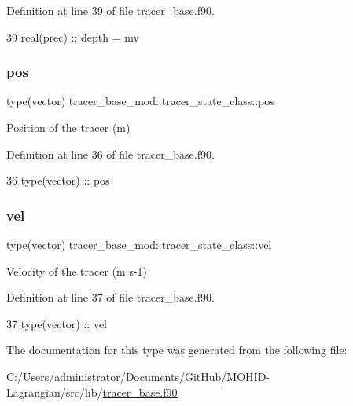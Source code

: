 Definition at line 39 of file tracer\+\_\+base.\+f90.


\begin{DoxyCode}
39         \textcolor{keywordtype}{real(prec)} :: depth = mv                 
\end{DoxyCode}
\mbox{\label{structtracer__base__mod_1_1tracer__state__class_a1b258c263cb63d6f03f08b6d969f94d7}} 
\subsubsection{\texorpdfstring{pos}{pos}}
{\footnotesize\ttfamily type(vector) tracer\+\_\+base\+\_\+mod\+::tracer\+\_\+state\+\_\+class\+::pos\hspace{0.3cm}{\ttfamily [private]}}



Position of the tracer (m) 



Definition at line 36 of file tracer\+\_\+base.\+f90.


\begin{DoxyCode}
36         \textcolor{keywordtype}{type}(vector) :: pos
\end{DoxyCode}
\mbox{\label{structtracer__base__mod_1_1tracer__state__class_a3ea133d907fd662b8be1bdb540e2929d}} 
\subsubsection{\texorpdfstring{vel}{vel}}
{\footnotesize\ttfamily type(vector) tracer\+\_\+base\+\_\+mod\+::tracer\+\_\+state\+\_\+class\+::vel\hspace{0.3cm}{\ttfamily [private]}}



Velocity of the tracer (m s-\/1) 



Definition at line 37 of file tracer\+\_\+base.\+f90.


\begin{DoxyCode}
37         \textcolor{keywordtype}{type}(vector) :: vel
\end{DoxyCode}


The documentation for this type was generated from the following file\+:\begin{DoxyCompactItemize}
\item 
C\+:/\+Users/administrator/\+Documents/\+Git\+Hub/\+M\+O\+H\+I\+D-\/\+Lagrangian/src/lib/\mbox{\hyperlink{tracer__base_8f90}{tracer\+\_\+base.\+f90}}\end{DoxyCompactItemize}
